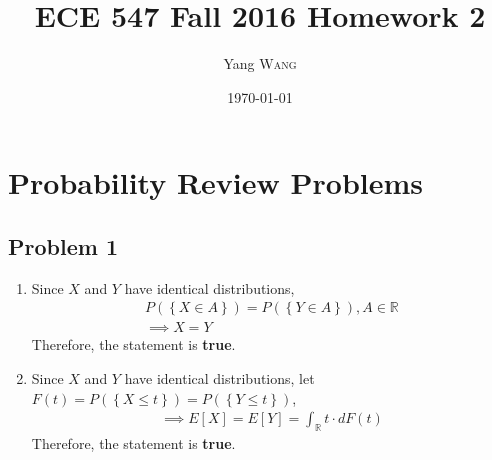 \documentclass{article}
\title{ECE 547 Fall 2016 Homework 2} %
\author{Yang \textsc{Wang}}  %
\date{\today} %
\begin{document}
\maketitle %


\section*{Probability Review Problems}
	\subsection*{Problem 1}
		\begin{enumerate}
			\item Since $X$ and $Y$ have identical distributions,
				\begin{gather*}
					P(\left\{X \in A\right\}) = P(\left\{Y \in A\right\}), A \in \mathbb{R} \\
					\implies X = Y
				\end{gather*}
				Therefore, the statement is \textbf{true}.
			\item Since $X$ and $Y$ have identical distributions,
				let $F(t) = P(\left\{X \leq t\right\}) = P(\left\{Y \leq t\right\})$,
				\begin{gather*}
					\implies E[X] = E[Y] = \int_{\mathbb{R}}^{}t \cdot dF(t)
				\end{gather*}
				Therefore, the statement is \textbf{true}.
		\end{enumerate}
\end{document}
